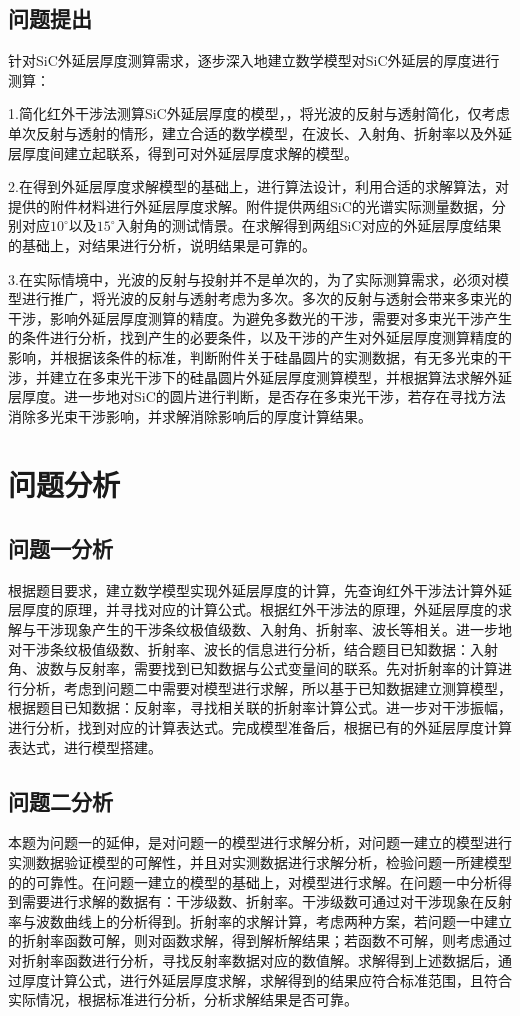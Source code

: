 \documentclass[UTF8]{ctexart}
\begin{document}
\subsection{问题提出}
针对SiC外延层厚度测算需求，逐步深入地建立数学模型对SiC外延层的厚度进行测算：\par 
1.简化红外干涉法测算SiC外延层厚度的模型，，将光波的反射与透射简化，仅考虑单次反射与透射的情形，建立合适的数学模型，在波长、入射角、折射率以及外延层厚度间建立起联系，得到可对外延层厚度求解的模型。\par 
2.在得到外延层厚度求解模型的基础上，进行算法设计，利用合适的求解算法，对提供的附件材料进行外延层厚度求解。附件提供两组SiC的光谱实际测量数据，分别对应$10^\circ$以及$15^\circ$入射角的测试情景。在求解得到两组SiC对应的外延层厚度结果的基础上，对结果进行分析，说明结果是可靠的。\par 
3.在实际情境中，光波的反射与投射并不是单次的，为了实际测算需求，必须对模型进行推广，将光波的反射与透射考虑为多次。多次的反射与透射会带来多束光的干涉，影响外延层厚度测算的精度。为避免多数光的干涉，需要对多束光干涉产生的条件进行分析，找到产生的必要条件，以及干涉的产生对外延层厚度测算精度的影响，并根据该条件的标准，判断附件关于硅晶圆片的实测数据，有无多光束的干涉，并建立在多束光干涉下的硅晶圆片外延层厚度测算模型，并根据算法求解外延层厚度。进一步地对SiC的圆片进行判断，是否存在多束光干涉，若存在寻找方法消除多光束干涉影响，并求解消除影响后的厚度计算结果。\par 
\section{问题分析}
\subsection{问题一分析}
根据题目要求，建立数学模型实现外延层厚度的计算，先查询红外干涉法计算外延层厚度的原理，并寻找对应的计算公式。根据红外干涉法的原理，外延层厚度的求解与干涉现象产生的干涉条纹极值级数、入射角、折射率、波长等相关。进一步地对干涉条纹极值级数、折射率、波长的信息进行分析，结合题目已知数据：入射角、波数与反射率，需要找到已知数据与公式变量间的联系。先对折射率的计算进行分析，考虑到问题二中需要对模型进行求解，所以基于已知数据建立测算模型，根据题目已知数据：反射率，寻找相关联的折射率计算公式。进一步对干涉振幅，进行分析，找到对应的计算表达式。完成模型准备后，根据已有的外延层厚度计算表达式，进行模型搭建。\par 
\subsection{问题二分析}
本题为问题一的延伸，是对问题一的模型进行求解分析，对问题一建立的模型进行实测数据验证模型的可解性，并且对实测数据进行求解分析，检验问题一所建模型的的可靠性。在问题一建立的模型的基础上，对模型进行求解。在问题一中分析得到需要进行求解的数据有：干涉级数、折射率。干涉级数可通过对干涉现象在反射率与波数曲线上的分析得到。折射率的求解计算，考虑两种方案，若问题一中建立的折射率函数可解，则对函数求解，得到解析解结果；若函数不可解，则考虑通过对折射率函数进行分析，寻找反射率数据对应的数值解。求解得到上述数据后，通过厚度计算公式，进行外延层厚度求解，求解得到的结果应符合标准范围，且符合实际情况，根据标准进行分析，分析求解结果是否可靠。\par 
\end{document}
